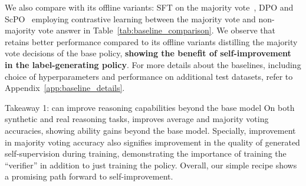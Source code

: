 We also compare \algo{} with its offline variants: SFT on the majority vote~\citep{huang-etal-2023-large}, DPO and ScPO~\citep{prasad2024selfconsistencypreferenceoptimization} employing contrastive learning between the majority vote and non-majority vote answer in Table~\ref{tab:baseline_comparison}. We observe that \algo{} retains better performance compared to its offline variants distilling the majority vote decisions of the base policy, \textbf{showing the benefit of self-improvement in the label-generating policy}. For more details about the baselines, including choice of hyperparameters and performance on additional test datasets, refer to Appendix~\ref{app:baseline_details}.

\begin{table}[h!]
    \centering

    \caption{\footnotesize \textbf{(Peak Performance)} We compare \algo{} against various baselines using a Qwen2.5-Math-7B model. Reported numbers are peak mean@32 accuracy, averaged over 3 heldout datasets: AIME 2024, AIME 2025, AMC. We find that \algo{} generally retains better performance compared to baseline methods distilling the majority voting decisions of the fixed teacher policy into the current model.}
    
    \vspace{10pt}
    \label{tab:baseline_comparison}
\end{table}


\begin{AIbox}{Takeaway 1: \algo{} can improve reasoning capabilities beyond the base model}
On both synthetic and real reasoning tasks, \algo{} improves average and majority voting accuracies, showing ability gains beyond the base model. Specially, improvement in majority voting accuracy also signifies improvement in the quality of generated self-supervision during training, demonstrating the importance of training the ``verifier'' in addition to just training the policy. Overall, our simple recipe shows a promising path forward to self-improvement. 
\end{AIbox}
\vspace{-0.1cm}

